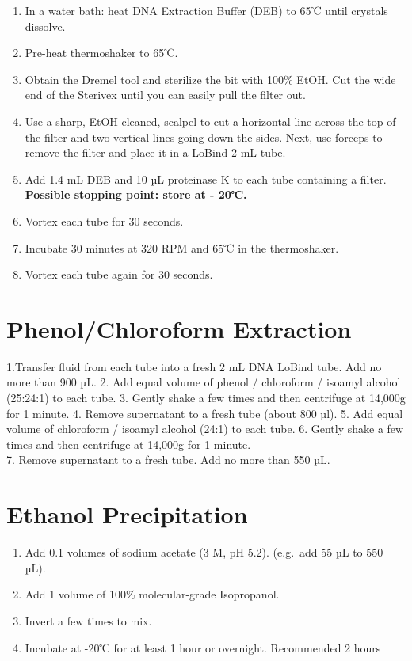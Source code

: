 \documentclass[
]{book}
\providecommand{\tightlist}{%
  \setlength{\itemsep}{0pt}\setlength{\parskip}{0pt}}
\begin{document}
\begin{enumerate}
\def\labelenumi{\arabic{enumi}.}
\tightlist
\item
  In a water bath: heat DNA Extraction Buffer (DEB) to 65℃ until crystals dissolve.
\item
  Pre-heat thermoshaker to 65℃.
\item
  Obtain the Dremel tool and sterilize the bit with 100\% EtOH. Cut the wide end of the Sterivex until you can easily pull the filter out.
\item
  Use a sharp, EtOH cleaned, scalpel to cut a horizontal line across the top of the filter and two vertical lines going down the sides. Next, use forceps to remove the filter and place it in a LoBind 2 mL tube.
\item
  Add 1.4 mL DEB and 10 µL proteinase K to each tube containing a filter.
  \textbf{Possible stopping point: store at - 20℃.}
\item
  Vortex each tube for 30 seconds.
\item
  Incubate 30 minutes at 320 RPM and 65℃ in the thermoshaker.
\item
  Vortex each tube again for 30 seconds.
\end{enumerate}

\hypertarget{phenolchloroform-extraction}{%
\section{Phenol/Chloroform Extraction}\label{phenolchloroform-extraction}}

1.Transfer fluid from each tube into a fresh 2 mL DNA LoBind tube. Add no more than 900 µL.
2. Add equal volume of phenol / chloroform / isoamyl alcohol (25:24:1) to each tube.
3. Gently shake a few times and then centrifuge at 14,000g for 1 minute.
4. Remove supernatant to a fresh tube (about 800 µl).
5. Add equal volume of chloroform / isoamyl alcohol (24:1) to each tube.
6. Gently shake a few times and then centrifuge at 14,000g for 1 minute.\\
7. Remove supernatant to a fresh tube. Add no more than 550 µL.

\hypertarget{ethanol-precipitation}{%
\section{Ethanol Precipitation}\label{ethanol-precipitation}}

\begin{enumerate}
\def\labelenumi{\arabic{enumi}.}
\tightlist
\item
  Add 0.1 volumes of sodium acetate (3 M, pH 5.2). (e.g.~add 55 µL to 550 µL).
\item
  Add 1 volume of 100\% molecular-grade Isopropanol.
\item
  Invert a few times to mix.
\item
  Incubate at -20℃ for at least 1 hour or overnight. Recommended 2 hours
\end{enumerate}
\end{document}
